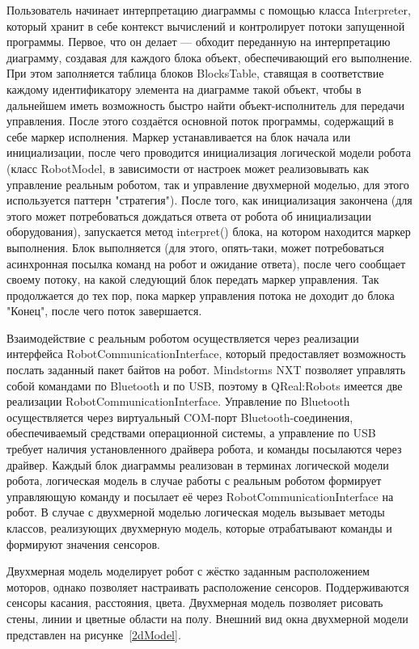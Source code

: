 \documentclass[a4paper]{article}
\begin{document}
Пользователь начинает интерпретацию диаграммы с помощью класса Interpreter, который хранит в себе контекст вычислений и контролирует потоки запущенной программы. Первое, что он делает --- обходит переданную на интерпретацию диаграмму, создавая для каждого блока объект, обеспечивающий его выполнение. При этом заполняется таблица блоков BlocksTable, ставящая в соответствие каждому идентификатору элемента на диаграмме такой объект, чтобы в дальнейшем иметь возможность быстро найти объект-исполнитель для передачи управления. После этого создаётся основной поток программы, содержащий в себе маркер исполнения. Маркер устанавливается на блок начала или инициализации, после чего проводится инициализация логической модели робота (класс RobotModel, в зависимости от настроек может реализовывать как управление реальным роботом, так и управление двухмерной моделью, для этого используется паттерн "стратегия"). После того, как инициализация закончена (для этого может потребоваться дождаться ответа от робота об инициализации оборудования), запускается метод interpret() блока, на котором находится маркер выполнения. Блок выполняется (для этого, опять-таки, может потребоваться асинхронная посылка команд на робот и ожидание ответа), после чего сообщает своему потоку, на какой следующий блок передать маркер управления. Так продолжается до тех пор, пока маркер управления потока не доходит до блока "Конец", после чего поток завершается.

Взаимодействие с реальным роботом осуществляется через реализации интерфейса RobotCommunicationInterface, который предоставляет возможность послать заданный пакет байтов на робот. Mindstorms NXT позволяет управлять собой командами по Bluetooth и по USB, поэтому в QReal:Robots имеется две реализации RobotCommunicationInterface. Управление по Bluetooth осуществляется через виртуальный COM-порт Bluetooth-соединения, обеспечиваемый средствами операционной системы, а управление по USB требует наличия установленного драйвера робота, и команды посылаются через драйвер. Каждый блок диаграммы реализован в терминах логической модели робота, логическая модель в случае работы с реальным роботом формирует управляющую команду и посылает её через RobotCommunicationInterface на робот. В случае с двухмерной моделью логическая модель вызывает методы классов, реализующих двухмерную модель, которые отрабатывают команды и формируют значения сенсоров.

Двухмерная модель моделирует робот с жёстко заданным расположением моторов, однако позволяет настраивать расположение сенсоров. Поддерживаются сенсоры касания, расстояния, цвета. Двухмерная модель позволяет рисовать стены, линии и цветные области на полу. Внешний вид окна двухмерной модели представлен на рисунке~\ref{2dModel}.
\end{document}
